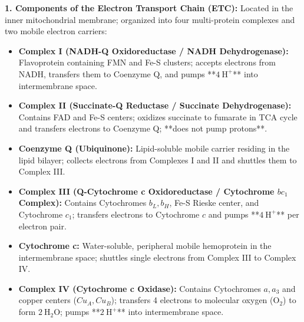 \documentclass[11pt,a4paper]{article}
\begin{document}
\begin{ansbox}
\textbf{1. Components of the Electron Transport Chain (ETC):}
Located in the inner mitochondrial membrane; organized into four multi-protein complexes and two mobile electron carriers:
\begin{itemize}[leftmargin=*]
    \item \textbf{Complex I (NADH-Q Oxidoreductase / NADH Dehydrogenase):} Flavoprotein containing FMN and Fe-S clusters; accepts electrons from NADH, transfers them to Coenzyme Q, and pumps **$4\ \text{H}^+$** into intermembrane space.
    \item \textbf{Complex II (Succinate-Q Reductase / Succinate Dehydrogenase):} Contains FAD and Fe-S centers; oxidizes succinate to fumarate in TCA cycle and transfers electrons to Coenzyme Q; **does not pump protons**.
    \item \textbf{Coenzyme Q (Ubiquinone):} Lipid-soluble mobile carrier residing in the lipid bilayer; collects electrons from Complexes I and II and shuttles them to Complex III.
    \item \textbf{Complex III (Q-Cytochrome c Oxidoreductase / Cytochrome $bc_1$ Complex):} Contains Cytochromes $b_L, b_H$, Fe-S Rieske center, and Cytochrome $c_1$; transfers electrons to Cytochrome $c$ and pumps **$4\ \text{H}^+$** per electron pair.
    \item \textbf{Cytochrome c:} Water-soluble, peripheral mobile hemoprotein in the intermembrane space; shuttles single electrons from Complex III to Complex IV.
    \item \textbf{Complex IV (Cytochrome c Oxidase):} Contains Cytochromes $a, a_3$ and copper centers ($Cu_A, Cu_B$); transfers 4 electrons to molecular oxygen ($\text{O}_2$) to form $2\ \text{H}_2\text{O}$; pumps **$2\ \text{H}^+$** into intermembrane space.
\end{itemize}


\end{ansbox}
\end{document}
